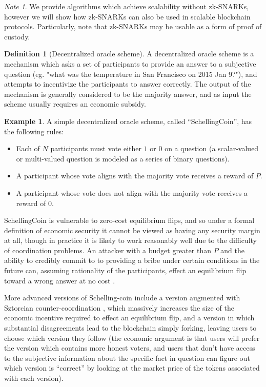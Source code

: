 \documentclass[11pt,a4paper]{report}
\theoremstyle{plain}
\theoremstyle{definition}
\newtheorem{defn}{Definition}[chapter]
\newtheorem{exmp}{Example}[section]
\theoremstyle{remark}
\newtheorem*{note}{Note}
\begin{document}
\begin{note}
We provide algorithms which achieve scalability without zk-SNARKs, however we will show how zk-SNARKs can also be used in scalable blockchain protocols. Particularly, note that zk-SNARKs may be usable as a form of proof of custody.
\end{note}

\begin{defn}[Decentralized oracle scheme]
A decentralized oracle scheme is a mechanism which asks a set of participants to provide an answer to a subjective question (eg. "what was the temperature in San Francisco on 2015 Jan 9?"), and attempts to incentivize the participants to answer correctly. The output of the mechanism is generally considered to be the majority answer, and as input the scheme usually requires an economic subsidy.
\end{defn}

\begin{exmp}
A simple decentralized oracle scheme, called ``SchellingCoin'', has the following rules:
\begin{itemize}
\item
Each of $N$ participants must vote either $1$ or $0$ on a question (a scalar-valued or multi-valued question is modeled as a series of binary questions).
\item
A participant whose vote aligns with the majority vote receives a reward of $P$.
\item
A participant whose vote does not align with the majority vote receives a reward of $0$.
\end{itemize}
SchellingCoin is vulnerable to zero-cost equilibrium flips, and so under a formal definition of economic security it cannot be viewed as having any security margin at all, though in practice it is likely to work reasonably well due to the difficulty of coordination problems. An attacker with a budget greater than $P$ and the ability to credibly commit to to providing a bribe under certain conditions in the future can, assuming rationality of the participants, effect an equilibrium flip toward a wrong answer at no cost \cite{pepsilon}.

More advanced versions of Schelling-coin include a version augmented with Sztorcian counter-coordination \cite{sztorc}, which massively increases the size of the economic incentive required to effect an equilibrium flip, and a version in which substantial disagreements lead to the blockchain simply forking, leaving users to choose which version they follow (the economic argument is that users will prefer the version which contains more honest voters, and users that don't have access to the subjective information about the specific fact in question can figure out which version is ``correct'' by looking at the market price of the tokens associated with each version). 
\end{exmp}
\end{document}
